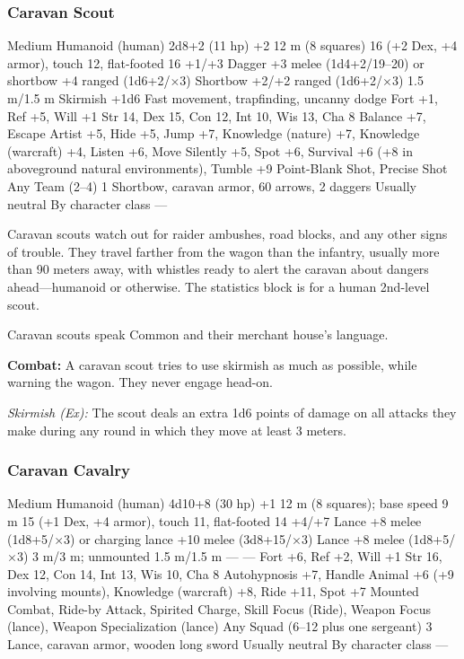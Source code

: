 \subsubsection{Caravan Scout}
\begin{MonsterStats}
{Medium Humanoid (human)}
{2d8+2 (11 hp)}
{+2}
{12 m (8 squares)}
{16 (+2 Dex, +4 armor), touch 12, flat-footed 16}
{+1/+3}
{Dagger +3 melee (1d4+2/19--20) or shortbow +4 ranged (1d6+2/$\times$3)}
{Shortbow +2/+2 ranged (1d6+2/$\times$3)}
{1.5 m/1.5 m}
{Skirmish +1d6}
{Fast movement, trapfinding, uncanny dodge}
{Fort +1, Ref +5, Will +1}
{Str 14, Dex 15, Con 12, Int 10, Wis 13, Cha 8}
{
	Balance +7,
	Escape Artist +5,
	Hide +5,
	Jump +7,
	Knowledge (nature) +7,
	Knowledge (warcraft) +4,
	Listen +6,
	Move Silently +5,
	Spot +6,
	Survival +6 (+8 in aboveground natural environments),
	Tumble +9
}
{
	Point-Blank Shot,
	Precise Shot
}
{Any}
{Team (2--4)}
{1}
{Shortbow, caravan armor, 60 arrows, 2 daggers}
{Usually neutral}
{By character class}
{---}
\end{MonsterStats}

Caravan scouts watch out for raider ambushes, road blocks, and any other signs of trouble. They travel farther from the wagon than the infantry, usually more than 90 meters away, with whistles ready to alert the caravan about dangers ahead---humanoid or otherwise. The statistics block is for a human 2nd-level scout.

Caravan scouts speak Common and their merchant house's language.

\textbf{Combat:} A caravan scout tries to use skirmish as much as possible, while warning the wagon. They never engage head-on.

\textit{Skirmish (Ex):} The scout deals an extra 1d6 points of damage on all attacks they make during any round in which they move at least 3 meters.


\subsubsection{Caravan Cavalry}
\begin{MonsterStats}
{Medium Humanoid (human)}
{4d10+8 (30 hp)}
{+1}
{12 m (8 squares); base speed 9 m}
{15 (+1 Dex, +4 armor), touch 11, flat-footed 14}
{+4/+7}
{Lance +8 melee (1d8+5/$\times$3) or charging lance +10 melee (3d8+15/$\times$3)}
{Lance +8 melee (1d8+5/$\times$3)}
{3 m/3 m; unmounted 1.5 m/1.5 m}
{---}
{---}
{Fort +6, Ref +2, Will +1}
{Str 16, Dex 12, Con 14, Int 13, Wis 10, Cha 8}
{
	Autohypnosis +7,
	Handle Animal +6 (+9 involving mounts),
	Knowledge (warcraft) +8,
	Ride +11,
	Spot +7
}
{
	Mounted Combat,
	Ride-by Attack,
	Spirited Charge,
	Skill Focus (Ride),
	Weapon Focus (lance),
	Weapon Specialization (lance)
}
{Any}
{Squad (6--12 plus one sergeant)}
{3}
{
	Lance,
	caravan armor,
	wooden long sword
}
{Usually neutral}
{By character class}
{---}
\end{MonsterStats}

